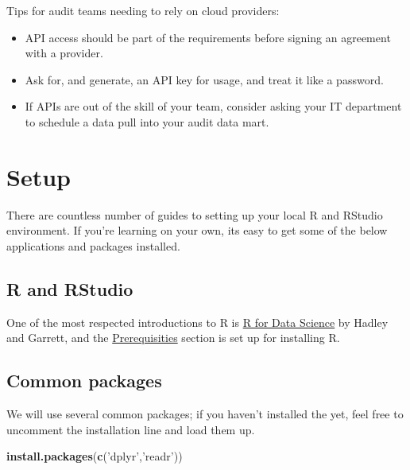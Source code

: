 \documentclass[
]{book}
\newenvironment{Shaded}{\begin{snugshade}}{\end{snugshade}}
\newcommand{\KeywordTok}[1]{\textcolor[rgb]{0.13,0.29,0.53}{\textbf{#1}}}
\newcommand{\NormalTok}[1]{#1}
\newcommand{\StringTok}[1]{\textcolor[rgb]{0.31,0.60,0.02}{#1}}
\providecommand{\tightlist}{%
  \setlength{\itemsep}{0pt}\setlength{\parskip}{0pt}}
\begin{document}
Tips for audit teams needing to rely on cloud providers:

\begin{itemize}
\tightlist
\item
  API access should be part of the requirements before signing an agreement with a provider.
\item
  Ask for, and generate, an API key for usage, and treat it like a password.
\item
  If APIs are out of the skill of your team, consider asking your IT department to schedule a data pull into your audit data mart.
\end{itemize}

\hypertarget{setup}{%
\chapter{Setup}\label{setup}}

There are countless number of guides to setting up your local R and RStudio environment. If you're learning on your own, its easy to get some of the below applications and packages installed.

\hypertarget{r-and-rstudio-1}{%
\section{R and RStudio}\label{r-and-rstudio-1}}

One of the most respected introductions to R is \href{https://r4ds.had.co.nz/introduction.html}{R for Data Science} by Hadley and Garrett, and the \href{https://r4ds.had.co.nz/introduction.html\#prerequisites}{Prerequisities} section is set up for installing R.

\hypertarget{common-packages}{%
\section{Common packages}\label{common-packages}}

We will use several common packages; if you haven't installed the yet, feel free to uncomment the installation line and load them up.

\begin{Shaded}
\begin{Highlighting}[]
\KeywordTok{install.packages}\NormalTok{(}\KeywordTok{c}\NormalTok{(}\StringTok{'dplyr'}\NormalTok{,}\StringTok{'readr'}\NormalTok{))}
\end{Highlighting}
\end{Shaded}
\end{document}
